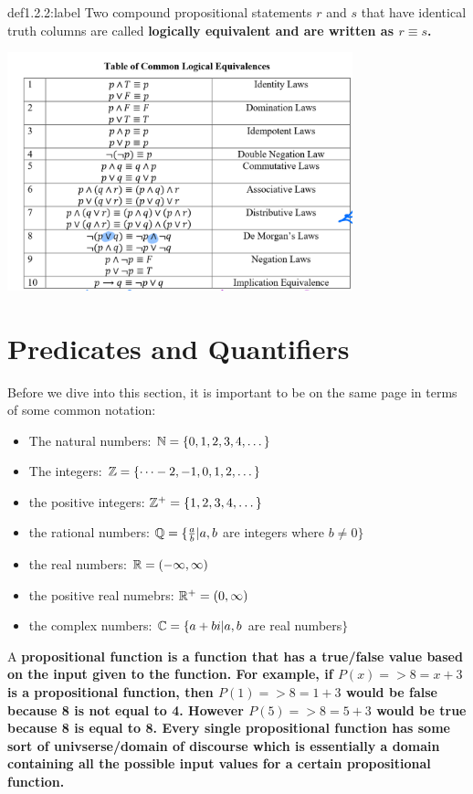 \begin{definition}{def1.2.2:label}
    Two compound propositional statements $r$ and $s$ that have identical truth columns are called \bf{logically equivalent} and are written as $r \equiv s$.
\end{definition}


\begin{center}
    \includegraphics[width=0.75\textwidth]{chapters/ch1/images/fig1.2.1.PNG}
\end{center}



\section{Predicates and Quantifiers}

Before we dive into this section, it is important to be on the same page in terms of some common notation:

\begin{itemize}
    \item The natural numbers: $\mathbb{N} = \{0,1,2,3,4,\dots\}$
    \item The integers: $\mathbb{Z} = \{\dots -2, -1, 0, 1, 2, \dots\}$
    \item the positive integers: $\mathbb{Z}^+ = \{1,2,3,4,\dots\}$
    \item the rational numbers: $\mathbb{Q} = \{\frac{a}{b} | a, b $ are integers where $ b \ne 0\}$
    \item the real numbers: $\mathbb{R} = (-\infty, \infty)$
    \item the positive real numebrs: $\mathbb{R}^+ = (0, \infty)$
    \item the complex numbers: $\mathbb{C} = \{a+bi | a,b $ are real numbers$\}$
\end{itemize}

A \bf{propositional function} is a function that has a true/false value based on the input given to the function. For example, if $P(x) => 8 = x + 3$ is a propositional function, then $P(1) => 8 = 1 + 3$ would be false because 8 is not equal to 4. However $P(5) => 8 = 5 + 3$ would be true because 8 is equal to 8. Every single propositional function has some sort of \bf{univserse/domain of discourse} which is essentially a domain containing all the possible input values for a certain propositional function.



